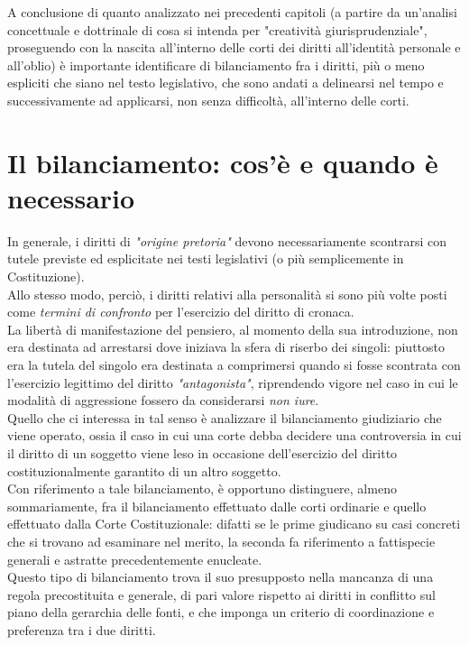 A conclusione di quanto analizzato nei precedenti capitoli (a partire da un'analisi concettuale e dottrinale di cosa si intenda per "creatività giurisprudenziale", proseguendo con la nascita all'interno delle corti dei diritti all'identità personale e all'oblio) è importante identificare di bilanciamento fra i diritti, più o meno espliciti che siano nel testo legislativo, che sono andati a delinearsi nel tempo e successivamente ad applicarsi, non senza difficoltà, all'interno delle corti.

\section{Il bilanciamento: cos'è e quando è necessario}
In generale, i diritti di \textit{"origine pretoria"} devono necessariamente scontrarsi con tutele previste ed esplicitate nei testi legislativi (o più semplicemente in Costituzione).
\\Allo stesso modo, perciò, i diritti relativi alla personalità si sono più volte posti come \textit{termini di confronto} per l'esercizio del diritto di cronaca.
\\La libertà di manifestazione del pensiero, al momento della sua introduzione, non era destinata ad arrestarsi dove iniziava la sfera di riserbo dei singoli: piuttosto era la tutela del singolo era destinata a comprimersi quando si fosse scontrata con l'esercizio legittimo del diritto \textit{"antagonista"}, riprendendo vigore nel caso in cui le modalità di aggressione fossero da considerarsi \textit{non iure}.
\\Quello che ci interessa in tal senso è analizzare il bilanciamento giudiziario che viene operato, ossia il caso in cui una corte debba decidere una controversia in cui il diritto di un soggetto viene leso in occasione dell'esercizio del diritto costituzionalmente garantito di un altro soggetto.
\\Con riferimento a tale bilanciamento, è opportuno distinguere, almeno sommariamente, fra il bilanciamento effettuato dalle corti ordinarie e quello effettuato dalla Corte Costituzionale: difatti se le prime giudicano su casi concreti che si trovano ad esaminare nel merito, la seconda fa riferimento a fattispecie generali e astratte precedentemente enucleate. 
\\Questo tipo di bilanciamento trova il suo presupposto nella mancanza di una regola precostituita e generale, di pari valore rispetto ai diritti in conflitto sul piano della gerarchia delle fonti, e che imponga un criterio di coordinazione e preferenza tra i due diritti.

